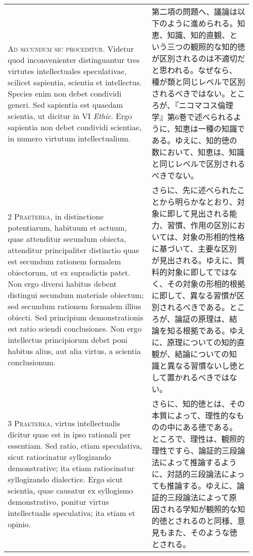 \documentclass[10pt]{jsarticle}
\begin{document}
\begin{longtable}{p{21em}p{21em}}

{\huge A}{\scshape d secundum sic proceditur}. Videtur quod
 inconvenienter distinguantur tres virtutes intellectuales
 speculativae, scilicet sapientia, scientia et intellectus. Species
 enim non debet condividi generi. Sed sapientia est quaedam scientia,
 ut dicitur in VI {\itshape Ethic}. Ergo sapientia non debet condividi
 scientiae, in numero virtutum intellectualium.

&

第二項の問題へ、議論は以下のように進められる。知恵、知識、知的直観、と
いう三つの観照的な知的徳が区別されるのは不適切だと思われる。なぜなら、
種が類と同じレベルで区別されるべきではない。ところが、『ニコマコス倫理
学』第6巻で述べられるように、知恵は一種の知識である。ゆえに、知的徳の
数において、知恵は、知識と同じレベルで区別されるべきでない。

\\

{\scshape 2 Praeterea}, in distinctione potentiarum, habituum et
actuum, quae attenditur secundum obiecta, attenditur principaliter
distinctio quae est secundum rationem formalem obiectorum, ut ex
supradictis patet. Non ergo diversi habitus debent distingui secundum
materiale obiectum; sed secundum rationem formalem illius obiecti. Sed
principium demonstrationis est ratio sciendi conclusiones. Non ergo
intellectus principiorum debet poni habitus alius, aut alia virtus, a
scientia conclusionum.

&

さらに、先に述べられたことから明らかなとおり、対象に即して見出される能
力、習慣、作用の区別においては、対象の形相的性格に基づいて、主要な区別
が見出される。ゆえに、質料的対象に即してではなく、その対象の形相的根拠
に即して、異なる習慣が区別されるべきである。ところが、論証の原理は、結
論を知る根拠である。ゆえに、原理についての知的直観が、結論についての知
識と異なる習慣ないし徳として置かれるべきではない。

\\

{\scshape 3 Praeterea}, virtus intellectualis dicitur quae est in ipso
 rationali per essentiam. Sed ratio, etiam speculativa, sicut
 ratiocinatur syllogizando demonstrative; ita etiam ratiocinatur
 syllogizando dialectice. Ergo sicut scientia, quae causatur ex
 syllogismo demonstrativo, ponitur virtus intellectualis speculativa;
 ita etiam et opinio.

&

さらに、知的徳とは、その本質によって、理性的なものの中にある徳である。
ところで、理性は、観照的理性ですら、論証的三段論法によって推論するよう
に、対話的三段論法によっても推論する。ゆえに、論証的三段論法によって原
因される学知が観照的な知的徳とされるのと同様、意見もまた、そのような徳
とされる。


\end{longtable}
\end{document}
